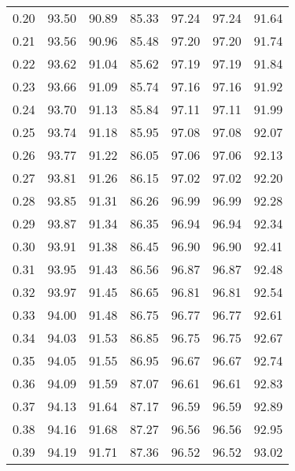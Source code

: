 \begin{tabular}{|c|c|c|c|c|c|c|}
      0.20 &     93.50 &     90.89 &      85.33 &   97.24 &      97.24 &         91.64 \\
      0.21 &     93.56 &     90.96 &      85.48 &   97.20 &      97.20 &         91.74 \\
      0.22 &     93.62 &     91.04 &      85.62 &   97.19 &      97.19 &         91.84 \\
      0.23 &     93.66 &     91.09 &      85.74 &   97.16 &      97.16 &         91.92 \\
      0.24 &     93.70 &     91.13 &      85.84 &   97.11 &      97.11 &         91.99 \\
      0.25 &     93.74 &     91.18 &      85.95 &   97.08 &      97.08 &         92.07 \\
      0.26 &     93.77 &     91.22 &      86.05 &   97.06 &      97.06 &         92.13 \\
      0.27 &     93.81 &     91.26 &      86.15 &   97.02 &      97.02 &         92.20 \\
      0.28 &     93.85 &     91.31 &      86.26 &   96.99 &      96.99 &         92.28 \\
      0.29 &     93.87 &     91.34 &      86.35 &   96.94 &      96.94 &         92.34 \\
      0.30 &     93.91 &     91.38 &      86.45 &   96.90 &      96.90 &         92.41 \\
      0.31 &     93.95 &     91.43 &      86.56 &   96.87 &      96.87 &         92.48 \\
      0.32 &     93.97 &     91.45 &      86.65 &   96.81 &      96.81 &         92.54 \\
      0.33 &     94.00 &     91.48 &      86.75 &   96.77 &      96.77 &         92.61 \\
      0.34 &     94.03 &     91.53 &      86.85 &   96.75 &      96.75 &         92.67 \\
      0.35 &     94.05 &     91.55 &      86.95 &   96.67 &      96.67 &         92.74 \\
      0.36 &     94.09 &     91.59 &      87.07 &   96.61 &      96.61 &         92.83 \\
      0.37 &     94.13 &     91.64 &      87.17 &   96.59 &      96.59 &         92.89 \\
      0.38 &     94.16 &     91.68 &      87.27 &   96.56 &      96.56 &         92.95 \\
      0.39 &     94.19 &     91.71 &      87.36 &   96.52 &      96.52 &         93.02 \\

\end{tabular}
